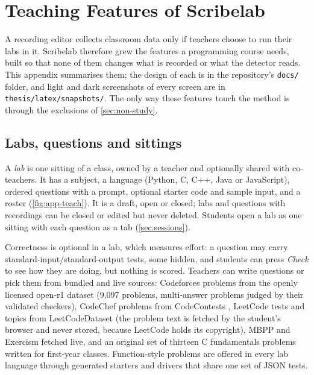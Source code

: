 \chapter{Teaching Features of Scribelab}
\label{app:features}

A recording editor collects classroom data only if teachers choose to run
their labs in it. Scribelab therefore grew the features a programming course
needs, built so that none of them changes what is recorded or what the detector
reads. This appendix summarises them; the design of each is in the repository's
\texttt{docs/} folder, and light and dark screenshots of every screen are in
\texttt{thesis/latex/snapshots/}. The only way these features touch the method
is through the exclusions of \cref{sec:non-study}.

\section{Labs, questions and sittings}
A \emph{lab} is one sitting of a class, owned by a teacher and optionally shared
with co-teachers. It has a subject, a language (Python, C, C++, Java or
JavaScript), ordered questions with a prompt, optional starter code and sample
input, and a roster (\cref{fig:app-teach}). It is a draft, open or closed; labs
and questions with recordings can be closed or edited but never deleted.
Students open a lab as one sitting with each question as a tab
(\cref{sec:sessions}).

Correctness is optional in a lab, which measures effort: a question may carry
standard-input/standard-output tests, some hidden, and students can press
\emph{Check} to see how they are doing, but nothing is scored. Teachers can
write questions or pick them from bundled and live sources: Codeforces
problems from the openly licensed open-r1 dataset \cite{penedo2025codeforces}
(9{,}097 problems, multi-answer problems judged by their validated checkers),
CodeChef problems from CodeContests \cite{li2022alphacode}, LeetCode tests and
topics from LeetCodeDataset \cite{xia2025leetcodedataset} (the problem text is
fetched by the student's browser and never stored, because LeetCode holds its
copyright), MBPP \cite{austin2021program} and Exercism fetched live, and an
original set of thirteen C fundamentals problems written for first-year
classes. Function-style problems are offered in every lab language through
generated starters and drivers that share one set of JSON tests.


